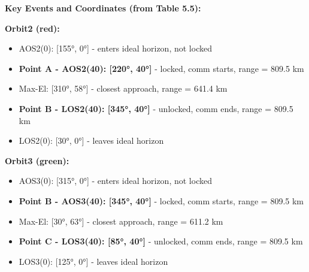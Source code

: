 \documentclass[11pt,letterpaper]{article}
\begin{document}
\begin{center}
\end{center}

\textbf{Key Events and Coordinates (from Table 5.5):}

\textbf{Orbit2 (red):}
\begin{itemize}
    \item AOS2(0): [155°, 0°] - enters ideal horizon, not locked
    \item \textbf{Point A - AOS2(40): [220°, 40°]} - locked, comm starts, range = 809.5 km
    \item Max-El: [310°, 58°] - closest approach, range = 641.4 km
    \item \textbf{Point B - LOS2(40): [345°, 40°]} - unlocked, comm ends, range = 809.5 km
    \item LOS2(0): [30°, 0°] - leaves ideal horizon
\end{itemize}

\textbf{Orbit3 (green):}
\begin{itemize}
    \item AOS3(0): [315°, 0°] - enters ideal horizon, not locked
    \item \textbf{Point B - AOS3(40): [345°, 40°]} - locked, comm starts, range = 809.5 km
    \item Max-El: [30°, 63°] - closest approach, range = 611.2 km
    \item \textbf{Point C - LOS3(40): [85°, 40°]} - unlocked, comm ends, range = 809.5 km
    \item LOS3(0): [125°, 0°] - leaves ideal horizon
\end{itemize}
\end{document}
